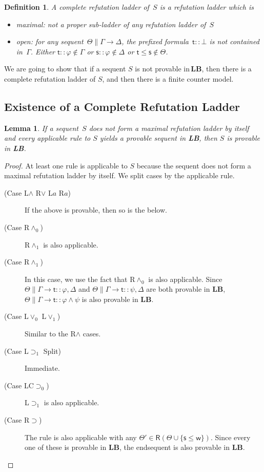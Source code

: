 \documentclass[doctor]{iscs-thesis}
\newtheorem{definition}{Definition}
\newtheorem{lemma}{Lemma}
\newcommand{\LB}{\textbf{LB}}
\begin{document}
\begin{definition}
A \textit{complete refutation ladder} of~$S$ is a refutation ladder which is
\begin{itemize}
 \item maximal: not a proper sub-ladder of any
       refutation ladder of~$S$
 \item open:
       for any sequent~$\Theta\parallel \Gamma\longrightarrow \Delta$,
      the prefixed formula~$\mathsf t::\bot$ is not contained in~$\Gamma$.       
       Either
       $\mathsf t::\varphi\notin \Gamma$ or
       $\mathsf s::\varphi\notin\Delta$ or $\mathsf t\le \mathsf s\notin
       \Theta$.
\end{itemize} 
\end{definition}

We are going to show that
if a sequent $S$ is not provable in\,\LB, then there is a complete
refutation ladder of $S$, and then there is a finite counter model.

\subsection{Existence of a Complete Refutation Ladder}

\begin{lemma}\label{chooser}
 If a sequent~$S$ does not form a maximal refutation ladder by itself and
 every applicable rule to $S$ yields a provable
 sequent in \LB, then $S$ is provable in \LB.
\end{lemma}
\begin{proof}
 At least one rule is applicable to $S$ because the sequent does
 not form a maximal refutation ladder by itself. We split cases by the
 applicable rule.
 \begin{description}
  \item[ (Case L$\wedge$ R$\vee$ L$a$ R$a$)]
	    If the above is provable, then so is the below.
  \item[ (Case R$\wedge_0$)]
	     R$\wedge_1$ is also applicable.
  \item[ (Case R$\wedge_1$)]
	     In this case, we use the fact that R$\wedge_0$ is also
	     applicable.
	     Since $\Theta\parallel\Gamma\longrightarrow \mathsf t::\varphi, \Delta$ and
	     $\Theta\parallel\Gamma\longrightarrow \mathsf t::\psi,
	     \Delta$ are both provable in \LB,
	     $\Theta\parallel\Gamma\longrightarrow \mathsf
	     t::\varphi\wedge\psi$ is also provable in \LB.
  \item[ (Case L$\vee_0$ L$\vee_1$)]
	     Similar to the R$\wedge$ cases.
  \item[ (Case L$\supset_1$ Split)] Immediate.
  \item[ (Case LC$\supset_0$)]
	     L$\supset_1$ is also applicable.
  \item[ (Case R$\supset$)]
	     The rule is also applicable with any $\Theta'\in
	     \mathsf R(\Theta\cup\{\mathsf s\le \mathsf w\})$. Since every one of these is
	     provable in \LB,
	     the endsequent is also provable in \LB.
 \end{description}
\end{proof}
\end{document}
